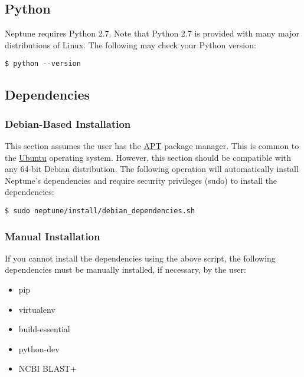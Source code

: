 \documentclass[a4paper,10pt]{article}
\begin{document}
\subsection{Python}

Neptune requires Python 2.7. Note that Python 2.7 is provided with many major distributions of Linux. The following may check your Python version:

\begin{minipage}{\linewidth}
\begin{lstlisting}[frame=single, style=bash]
$ python --version
\end{lstlisting}
\end{minipage}

\subsection{Dependencies}

\subsubsection{Debian-Based Installation}

This section assumes the user has the \href{https://help.ubuntu.com/community/AptGet/Howto}{APT} package manager. This is common to the \href{https://en.wikipedia.org/wiki/Ubuntu_(operating_system)}{Ubuntu} operating system. However, this section should be compatible with any 64-bit Debian distribution. The following operation will automatically install Neptune's dependencies and require security privileges (sudo) to install the dependencies:

\begin{minipage}{\linewidth}
\begin{lstlisting}[frame=single, style=bash]
$ sudo neptune/install/debian_dependencies.sh
\end{lstlisting}
\end{minipage}

\subsubsection{Manual Installation}

If you cannot install the dependencies using the above script, the following dependencies must be manually installed, if necessary, by the user:

\begin{itemize}
  \small
  \item pip
  \item virtualenv
  \item build-essential
  \item python-dev
  \item NCBI BLAST+
\end{itemize}
\end{document}
